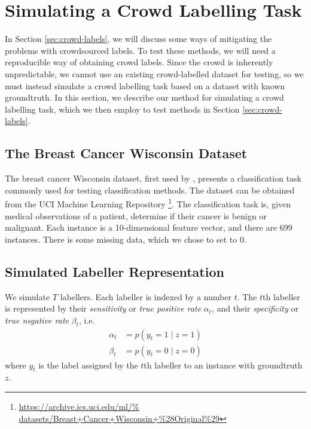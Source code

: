 \section{Simulating a Crowd Labelling Task}
\label{sec:crowd-simulation}
    
    In Section \ref{sec:crowd-labels}, we will discuss some ways of mitigating
    the problems with crowdsourced labels. To test these methods, we will need a
    reproducible way of obtaining crowd labels. Since the crowd is inherently
    unpredictable, we cannot use an existing crowd-labelled dataset for testing,
    so we must instead simulate a crowd labelling task based on a dataset with
    known groundtruth. In this section, we describe our method for simulating a
    crowd labelling task, which we then employ to test methods in Section
    \ref{sec:crowd-labels}.

    \subsection{The Breast Cancer Wisconsin Dataset}
    \label{sec:breast-dataset}

        The breast cancer Wisconsin dataset, first used by
        \citeauthor{wolberg90}, presents a classification task commonly used for
        testing classification methods. The dataset can be obtained from the UCI
        Machine Learning Repository \citep{lichman13}
        \footnote{\url{https://archive.ics.uci.edu/ml/%
                       datasets/Breast+Cancer+Wisconsin+\%28Original\%29}}.
        The classification task is, given medical observations of a patient,
        determine if their cancer is benign or malignant. Each instance is a
        10-dimensional feature vector, and there are 699 instances. There is
        some missing data, which we chose to set to 0.

    \subsection{Simulated Labeller Representation}
    \label{sec:simulated-labellers}

        We simulate $T$ labellers. Each labeller is indexed by a number $t$. The
        $t$th labeller is represented by their \emph{sensitivity} or \emph{true
        positive rate} $\alpha_t$, and their \emph{specificity} or \emph{true
        negative rate} $\beta_t$, i.e.
        \begin{align*}
            \alpha_t &= p(y_t = 1 \mid z = 1)\\
            \beta_t &= p(y_t = 0 \mid z = 0)
        \end{align*}
        where $y_t$ is the label assigned by the $t$th labeller to an instance
        with groundtruth $z$.

